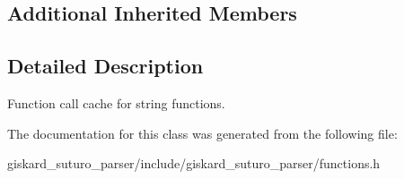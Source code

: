 \subsection*{Additional Inherited Members}


\subsection{Detailed Description}
Function call cache for string functions. 

The documentation for this class was generated from the following file\-:\begin{DoxyCompactItemize}
\item 
giskard\-\_\-suturo\-\_\-parser/include/giskard\-\_\-suturo\-\_\-parser/functions.\-h\end{DoxyCompactItemize}
